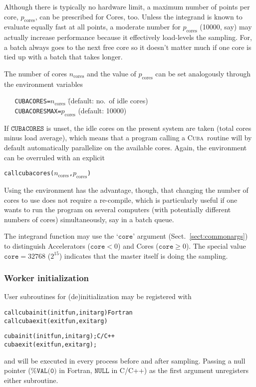 \documentclass[12pt]{article}
\newcommand\cuba{\textsc{Cuba}}
\newcommand\cores{_{\mathrm{cores}}}
\newcommand\Code[1]{\ensuremath{\texttt{#1}}}
\begin{document}
Although there is typically no hardware limit, a maximum number of 
points per core, $p\cores$, can be prescribed for Cores, too.  Unless 
the integrand is known to evaluate equally fast at all points, a 
moderate number for $p\cores$ (10000, say) may actually increase 
performance because it effectively load-levels the sampling.  For, a 
batch always goes to the next free core so it doesn't matter much 
if one core is tied up with a batch that takes longer.

The number of cores $n\cores$ and the value of $p\cores$ can be set 
analogously through the environment variables
\begin{tabbing}
\verb|   CUBACORES=|$n\cores$ \hspace{10em}\= (default: no.\ of idle cores) \\
\verb|   CUBACORESMAX=|$p\cores$ \> (default: 10000)
\end{tabbing}
If \Code{CUBACORES} is unset, the idle cores on the present system are 
taken (total cores minus load average), which means that a program 
calling a \cuba\ routine will by default automatically parallelize on 
the available cores.  Again, the environment can be overruled with an 
explicit
\begin{alltt}
   call cubacores(\(n\cores\), \(p\cores\))   
\end{alltt}
Using the environment has the advantage, though, that changing the 
number of cores to use does not require a re-compile, which is 
particularly useful if one wants to run the program on several computers 
(with potentially different numbers of cores) simultaneously, say in a 
batch queue.

The integrand function may use the `\Code{core}' argument 
(Sect.~\ref{sect:commonargs}) to distinguish Accelerators ($\Code{core} 
< 0$) and Cores ($\Code{core}\geqslant 0$).  The special value 
$\Code{core} = 32768$ ($2^{15}$) indicates that the master itself is 
doing the sampling.


\subsubsection{Worker initialization}

User subroutines for (de)initialization may be registered with
\begin{alltt}
   call cubainit(initfun, initarg)           \textrm{Fortran}
   call cubaexit(exitfun, exitarg)
\end{alltt}
\begin{alltt}
   cubainit(initfun, initarg);               \textrm{C/C++}
   cubaexit(exitfun, exitarg);
\end{alltt}
and will be executed in every process before and after sampling.
Passing a null pointer (\Code{\%VAL(0)} in Fortran, \Code{NULL} in
C/C++) as the first argument unregisters either subroutine.
\end{document}
